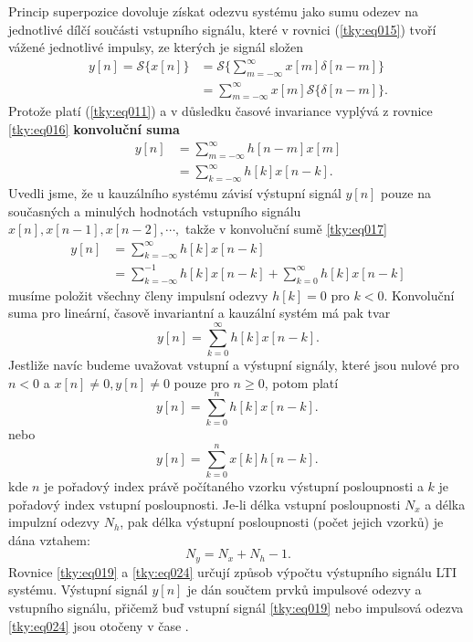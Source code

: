       Princip superpozice dovoluje získat odezvu systému jako sumu odezev na jednotlivé dílčí
      součásti vstupního signálu, které v rovnici (\ref{tky:eq015}) tvoří vážené jednotlivé impulsy,
      ze kterých je signál složen
      \begin{align}
        y[n]=\mathcal{S}\{x[n]\}
          &=\mathcal{S}\{\sum_{m=-\infty}^{\infty}x[m]\delta[n-m]\}  \nonumber \\
          &=\sum_{m=-\infty}^{\infty}x[m]\mathcal{S}\{\delta[n-m]\}. \label{tky:eq016}
      \end{align}
      Protože platí (\ref{tky:eq011}) a v důsledku časové invariance vyplývá z rovnice
      \ref{tky:eq016} \textbf{konvoluční suma} 
      \begin{align}
        y[n]&=\sum_{m=-\infty}^{\infty}h[n-m]x[m]               \nonumber \\
            &=\sum_{k=-\infty}^{\infty}h[k]x[n-k].              \label{tky:eq017}
      \end{align}
      Uvedli jsme, že u kauzálního systému závisí výstupní signál $y[n]$ pouze na současných a
      minulých hodnotách vstupního signálu $x[n], x[n-1], x[n-2], \cdots ,$ takže v konvoluční sumě
      \ref{tky:eq017}
      \begin{align*}
        y[n]&=\sum_{k=-\infty}^{\infty}h[k]x[n-k]              \\               
            &=\sum_{k=-\infty}^{-1}h[k]x[n-k] + \sum_{k=0}^{\infty}h[k]x[n-k]  
      \end{align*}
      musíme položit všechny členy impulsní odezvy $h[k]=0$ pro $k<0$. Konvoluční suma pro
      lineární, časově invariantní a kauzální systém má pak tvar
      \begin{equation}\label{tky:eq018}
        y[n]=\sum_{k=0}^{\infty}h[k]x[n-k].
      \end{equation}
      Jestliže navíc budeme uvažovat vstupní a výstupní signály, které jsou nulové pro $n<0$ a
      $x[n]\neq0, y[n]\neq0$ pouze pro $n\geq0$, potom platí
      \begin{equation}\label{tky:eq019}
        \boxed{y[n]=\sum_{k=0}^{n}h[k]x[n-k].\,}
      \end{equation}
      nebo
      \begin{equation}\label{tky:eq024}
        \boxed{y[n]=\sum_{k=0}^{n}x[k]h[n-k].\,}
      \end{equation}
      kde \(n\) je pořadový index právě počítaného vzorku výstupní posloupnosti a \(k\) je pořadový
      index vstupní posloupnosti. Je-li délka vstupní posloupnosti \(N_x\) a délka impulzní odezvy
      \(N_h\), pak délka výstupní posloupnosti (počet jejich vzorků) je dána vztahem:
      \begin{equation}\label{tky:eq025}
        N_y = N_x + N_h - 1.
      \end{equation}
      Rovnice \ref{tky:eq019} a \ref{tky:eq024} určují způsob výpočtu výstupního signálu LTI
      systému. Výstupní signál \(y[n]\) je dán součtem prvků impulsové odezvy a vstupního signálu,
      přičemž buď vstupní signál \ref{tky:eq019} nebo impulsová odezva \ref{tky:eq024} jsou otočeny
      v čase \cite[s.~14]{Davidek1996}.
      
